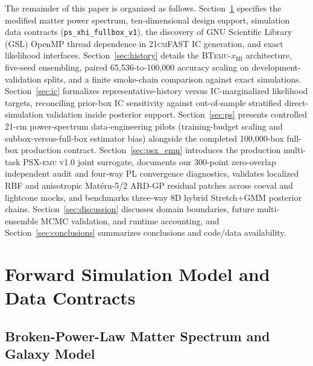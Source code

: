 \documentclass[aps,prd,reprint,superscriptaddress,nofootinbib,amsmath,amssymb,floatfix,longbibliography]{revtex4-2}
\begin{document}
The remainder of this paper is organized as follows. Section~\ref{sec:model} specifies the modified matter power spectrum, ten-dimensional design support, simulation data contracts (\texttt{ps\_xhi\_fullbox\_v1}), the discovery of GNU Scientific Library (GSL) OpenMP thread dependence in \textsc{21cmFAST} IC generation, and exact likelihood interfaces. Section~\ref{sec:history} details the \textsc{BTemu}-$x_{\mathrm{HI}}$ architecture, five-seed ensembling, paired 65,536-to-100,000 accuracy scaling on development-validation splits, and a finite smoke-chain comparison against exact simulations. Section~\ref{sec:ic} formalizes representative-history versus IC-marginalized likelihood targets, reconciling prior-box IC sensitivity against out-of-sample stratified direct-simulation validation inside posterior support. Section~\ref{sec:ps} presents controlled 21-cm power-spectrum data-engineering pilots (training-budget scaling and subbox-versus-full-box estimator bias) alongside the completed 100,000-box full-box production contract. Section~\ref{sec:psx_emu} introduces the production multi-task \textsc{PSX-emu v1.0} joint surrogate, documents our 300-point zero-overlap independent audit and four-way PL convergence diagnostics, validates localized RBF and anisotropic Mat\'ern-5/2 ARD-GP residual patches across coeval and lightcone mocks, and benchmarks three-way 8D hybrid Stretch+GMM posterior chains. Section~\ref{sec:discussion} discusses domain boundaries, future multi-ensemble MCMC validation, and runtime accounting, and Section~\ref{sec:conclusions} summarizes conclusions and code/data availability.

\section{Forward Simulation Model and Data Contracts}\label{sec:model}

\subsection{Broken-Power-Law Matter Spectrum and Galaxy Model}\label{sec:bt_model}
\end{document}
